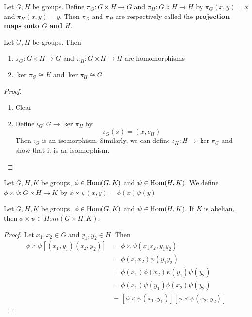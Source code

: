 \documentclass{book}
\begin{document}
	\begin{defn} 
	Let $G,H$ be groups. Define $\pi_G :G \times H \rightarrow G$ and $\pi_H :G \times H \rightarrow H$ by $\pi_G(x,y) = x$ and $\pi_H(x,y) = y$.  Then $\pi_G$ and $\pi_H$ are respectively called the \textbf{projection maps onto $G$ and $H$}.
	\end{defn}	
	
	\begin{ex}
	 Let $G,H$ be groups. Then 
	\begin{enumerate}
	\item $\pi_G: G \times H \rightarrow G$ and $\pi_H : G \times H \rightarrow H$ are homomorphisms
	\item $\ker \pi_G \cong H$ and $\ker \pi_H \cong G$
\end{enumerate}	 
	\end{ex}
	
	\begin{proof}\
	\begin{enumerate}
	\item Clear
	\item Define $\iota_G:G \rightarrow \ker \pi_H$ by $$\iota_G(x) = (x, e_H)$$ Then $\iota_G$ is an isomorphism. Similarly, we can define $\iota_H:H \rightarrow \ker \pi_G$ and show that it is an isomorphism.
	\end{enumerate}
	\end{proof}
	
	\begin{defn}
	Let $G,H, K$ be groups, $\phi \in \operatorname{Hom}(G,K)$ and $\psi \in \operatorname{Hom}(H, K)$. We define $\phi \times \psi: G \times H \rightarrow K$ by $\phi \times \psi(x,y) = \phi(x) \psi(y)$ 
	\end{defn}	
	
	\begin{ex}
	 Let $G,H, K$ be groups, $\phi \in \operatorname{Hom}(G,K)$ and $\psi \in \operatorname{Hom}(H, K)$. If $K$ is abelian, then $\phi \times \psi \in Hom(G \times H,K)$.
	\end{ex}
	
	\begin{proof}
	Let $x_1, x_2 \in G$ and $y_1, y_2 \in H$. Then 
	\begin{align*}
	\phi \times \psi[(x_1, y_1)(x_2, y_2)] 
	&= \phi \times \psi (x_1x_2, y_1y_2) \\
	&= \phi(x_1x_2) \psi(y_1y_2) \\
	&= \phi(x_1)\phi(x_2)\psi(y_1)\psi(y_2) \\
	&= \phi(x_1)\psi(y_1)\phi(x_2)\psi(y_2) \\
	&= [\phi \times \psi(x_1, y_1)] [\phi \times \psi(x_2, y_2) ]
	\end{align*}
	\end{proof}
	
\end{document}
